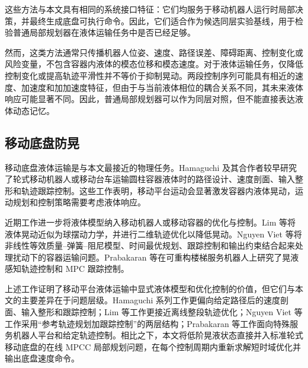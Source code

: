 \documentclass[12pt,a4paper]{ctexart}
\newcommand{\MPCC}{MPCC}
\newcommand{\MPC}{MPC}
\begin{document}
这些方法与本文具有相同的系统接口特征：它们均服务于移动机器人运行时局部决策，并最终生成底盘可执行命令。因此，它们适合作为候选同层实验基线，用于检验普通局部规划器在液体运输任务中是否已经足够。

然而，这类方法通常只传播机器人位姿、速度、路径误差、障碍距离、控制变化或风险变量，不包含容器内液体的模态位移和模态速度。对于液体运输任务，仅降低控制变化或提高轨迹平滑性并不等价于抑制晃动。两段控制序列可能具有相近的速度、加速度和加加速度特征，但由于与当前液体相位的耦合关系不同，其未来液体响应可能显著不同。因此，普通局部规划器可以作为同层对照，但不能直接表达液体动态记忆。

\subsection{移动底盘防晃}
\label{subsec:mobile-liquid-transport}

移动底盘液体运输是与本文最接近的物理任务。Hamaguchi 及其合作者较早研究了轮式移动机器人或移动台车运输圆柱容器液体时的路径设计、速度剖面、输入整形和轨迹跟踪控制\cite{B04_Hamaguchi2002,B03_Hamaguchi2004,B02_Hamaguchi2005}。这些工作表明，移动平台运动会显著激发容器内液体晃动，运动规划和控制策略需要考虑液体响应。

近期工作进一步将液体模型纳入移动机器人或移动容器的优化与控制。Lim 等将液体晃动近似为球摆动力学，并进行二维轨迹优化以降低晃动\cite{B01_Lim2024}。Nguyen Viet 等将非线性等效质量--弹簧--阻尼模型、时间最优规划、跟踪控制和输出约束结合起来处理扰动下的容器运输问题\cite{B11_Viet2025}。Prabakaran 等在可重构楼梯服务机器人上研究了晃液感知轨迹控制和 \MPC{} 跟踪控制\cite{B12_Prabakaran2026}。

上述工作证明了移动平台液体运输中显式液体模型和优化控制的价值，但它们与本文的主要差异在于问题层级。Hamaguchi 系列工作更偏向给定路径后的速度剖面、输入整形和跟踪控制；Lim 等工作更接近离线整段轨迹优化；Nguyen Viet 等工作采用“参考轨迹规划加跟踪控制”的两层结构；Prabakaran 等工作面向特殊服务机器人平台和给定轨迹控制。相比之下，本文将低阶晃液状态直接并入标准轮式移动底盘的在线 \MPCC{} 局部规划问题，在每个控制周期内重新求解短时域优化并输出底盘速度命令。
\end{document}
